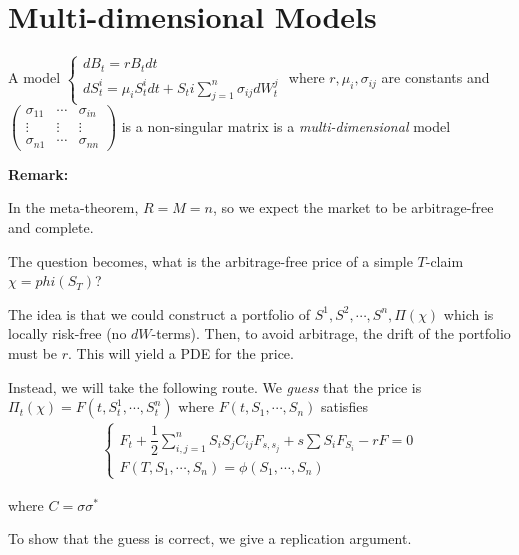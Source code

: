 \section{Multi-dimensional Models}
\begin{defo}{}
  A model $\begin{cases}
    dB_t = rB_tdt\\ dS_t^i = \mu_iS_t^idt+S_ti\sum_{j=1}^{n}\sigma_{ij}dW_t^j
    \end{cases}$ where $r,\mu_i,\sigma_{ij}$ are constants and $\begin{pmatrix}\sigma_{11}&\cdots&\sigma_{in}\\\vdots&\vdots&\vdots\\\sigma_{n1}&\cdots&\sigma_{nn}\end{pmatrix}$ is a non-singular matrix is a \textit{multi-dimensional }model
\end{defo}
\par\bigskip
\noindent\textbf{Remark:}\par
\noindent In the meta-theorem, $R=M=n$, so we expect the market to be arbitrage-free and complete.
\par\bigskip
\noindent The question becomes, what is the arbitrage-free price of a simple $T$-claim $\chi = phi(S_T)$?
\par\bigskip
\noindent The idea is that we could construct a portfolio of $S^1,S^2,\cdots,S^n,\Pi(\chi)$ which is locally risk-free (no $dW$-terms). Then, to avoid arbitrage, the drift of the portfolio must be $r$. This will yield a PDE for the price.
\par\bigskip
\noindent Instead, we will take the following route. We \textit{guess} that the price is $\Pi_t(\chi) = F(t,S_t^1,\cdots,S_t^n)$ where $F(t,S_1,\cdots,S_n)$ satisfies
\begin{equation}
  \begin{gathered}
    \begin{cases}
      F_t+\dfrac{1}{2}\sum_{i,j=1}^{n}S_iS_jC_{ij}F_{s,s_j}+s\sum S_iF_{S_i}-rF=0\\
      F(T,S_1,\cdots,S_n) = \phi(S_1,\cdots,S_n)
    \end{cases}
  \end{gathered}
\end{equation}\par
\noindent where $C=\sigma\sigma^*$\par
\noindent To show that the guess is correct, we give a replication argument.
\par\bigskip
